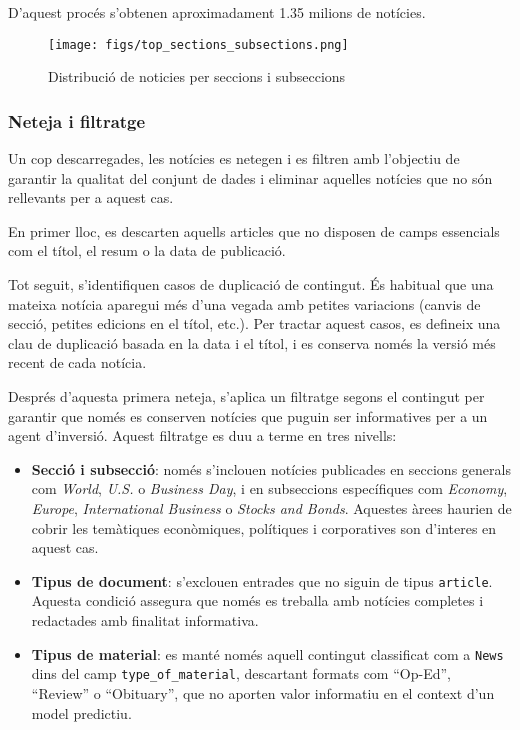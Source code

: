 \documentclass[12pt,a4paper,twoside]{book}
\begin{document}
D'aquest procés s'obtenen aproximadament 1.35 milions de notícies.

\begin{figure}[H]
	\centering
	\texttt{[image: figs/top\_sections\_subsections.png]}
	\caption{Distribució de noticies per seccions i subseccions}
	\label{fig:context-anoni1}
\end{figure}



\subsubsection*{Neteja i filtratge}

Un cop descarregades, les notícies es netegen i es filtren amb l'objectiu de garantir la qualitat del conjunt de dades i eliminar aquelles notícies que no són rellevants per a aquest cas.

En primer lloc, es descarten aquells articles que no disposen de camps essencials com el títol, el resum o la data de publicació.

Tot seguit, s'identifiquen casos de duplicació de contingut. És habitual que una mateixa notícia aparegui més d'una vegada amb petites variacions (canvis de secció, petites edicions en el títol, etc.). Per tractar aquest casos, es defineix una clau de duplicació basada en la data i el títol, i es conserva només la versió més recent de cada notícia.

Després d'aquesta primera neteja, s'aplica un filtratge segons el contingut per garantir que només es conserven notícies que puguin ser informatives per a un agent d'inversió. Aquest filtratge es duu a terme en tres nivells:

\begin{itemize}
    \item \textbf{Secció i subsecció}: només s'inclouen notícies publicades en seccions generals com \textit{World}, \textit{U.S.} o \textit{Business Day}, i en subseccions específiques com \textit{Economy}, \textit{Europe}, \textit{International Business} o \textit{Stocks and Bonds}. Aquestes àrees haurien de cobrir les temàtiques econòmiques, polítiques i corporatives son d'interes en aquest cas.

    \item \textbf{Tipus de document}: s'exclouen entrades que no siguin de tipus \texttt{article}. Aquesta condició assegura que només es treballa amb notícies completes i redactades amb finalitat informativa.

    \item \textbf{Tipus de material}: es manté només aquell contingut classificat com a \texttt{News} dins del camp \texttt{type\_of\_material}, descartant formats com “Op-Ed”, “Review” o “Obituary”, que no aporten valor informatiu en el context d'un model predictiu.
\end{itemize}
\end{document}
